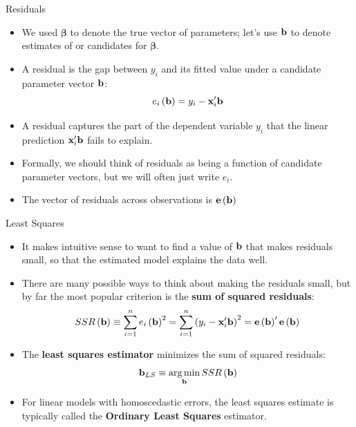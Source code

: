 \documentclass[aspectratio=169,11pt]{beamer}
\begin{document}
\begin{frame}{Residuals}
\begin{itemize}
	\item We used $\boldsymbol{\beta}$ to denote the true vector of parameters; let's use
	${\bf b}$ to denote estimates of or candidates for $\boldsymbol{\beta}$.

	\item A residual is the gap between $y_i$ and its fitted value under a candidate parameter vector ${\bf b}$:\[
		e_i \left({\bf b}\right) = y_i - {\bf x}_i' {\bf b}
	\]

	\item A residual captures the part of the dependent variable $y_{i}$ that the linear prediction ${\bf x}_i' {\bf b}$
	fails to explain.
	

	\item Formally, we should think of residuals as being a function of candidate parameter
	vectors, but we will often just write $e_i$. 


	\item The vector of residuals across observations is ${\bf e} \left({\bf b}\right)$
\end{itemize}
\end{frame}


\begin{frame}{Least Squares}
\begin{itemize}
	\item It makes intuitive sense to want to find a value of ${\bf b}$
	 that makes residuals small, so that the estimated model explains the data well.

	\smallskip
	\item There are many possible ways to think about making the residuals small, but
	by far the most popular criterion is the {\bf sum of squared residuals}:\[
		SSR\left({\bf b}\right) \equiv \sum_{i=1}^{n} e_i \left({\bf b}\right)^2  =  \sum_{i=1}^{n} \left(y_i - {\bf x}_i' {\bf b}\right)^{2} = {\bf e} \left({\bf b}\right) '  {\bf e} \left({\bf b}\right)
	\]

	\smallskip
	\item The {\bf least squares estimator} minimizes the sum of squared residuals:\[
		{\bf b}_{LS} \equiv \operatorname*{arg\,min}_{{\bf b}} SSR\left({\bf b}\right) 
	\]

	\smallskip
	\item For linear models with homoscedastic errors, the least squares estimate is typically called the
	{\bf Ordinary Least Squares} estimator.

\end{itemize}
\end{frame}
\end{document}
